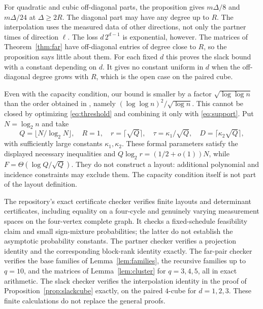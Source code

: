 \documentclass[11pt]{article}
\begin{document}
For quadratic and cubic off-diagonal parts, the proposition gives $m\Delta/8$ and $m\Delta/24$ at $\Delta\ge2R$. The diagonal part may have any degree up to $R$. The interpolation uses the measured data of other directions, not only the partner times of direction $\ell$. The loss $d\,2^{d-1}$ is exponential, however. The matrices of Theorem~\ref{thm:far} have off-diagonal entries of degree close to $R$, so the proposition says little about them. For each fixed $d$ this proves the slack bound with a constant depending on $d$. It gives no constant uniform in $d$ when the off-diagonal degree grows with $R$, which is the open case on the paired cube.

Even with the capacity condition, our bound is smaller by a factor $\sqrt{\log\log n}$ than the order obtained in \cite{openai}, namely $(\log\log n)^2/\sqrt{\log n}$. This cannot be closed by optimizing \eqref{eq:threshold} and combining it only with \eqref{eq:support}. Put $N=\log_2n$ and take
\[Q=\lfloor N/\log_2N\rfloor,\quad R=1,\quad r=\lceil\sqrt Q\rceil,\quad \tau=\kappa_1/\sqrt Q,\quad D=\lceil \kappa_2\sqrt Q\rceil,\]
with sufficiently large constants $\kappa_1,\kappa_2$. These formal parameters satisfy the displayed necessary inequalities and $Q\log_2r=(1/2+o(1))N$, while $F=\Theta(\log Q/\sqrt Q)$. They do not construct a layout: additional polynomial and incidence constraints may exclude them. The capacity condition itself is not part of the layout definition.

The repository's exact certificate checker verifies finite layouts and determinant certificates, including equality on a four-cycle and genuinely varying measurement spaces on the four-vertex complete graph. It checks a fixed-schedule feasibility claim and small sign-mixture probabilities; the latter do not establish the asymptotic probability constants. The partner checker verifies a projection identity and the corresponding block-rank identity exactly. The far-pair checker verifies the base families of Lemma~\ref{lem:families}, the recursive families up to $q=10$, and the matrices of Lemma~\ref{lem:cluster} for $q=3,4,5$, all in exact arithmetic. The slack checker verifies the interpolation identity in the proof of Proposition~\ref{prop:slackcube} exactly, on the paired $4$-cube for $d=1,2,3$. These finite calculations do not replace the general proofs.
\end{document}
